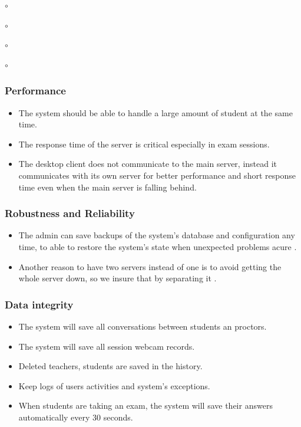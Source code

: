 \documentclass[]{uc2pfecaneva}
\begin{document}
\begin{list}{$\circ$}{}
\begin{list}{$\circ$}{}
\begin{list}{$\circ$}{}
\begin{list}{$\circ$}{}
    \raggedright\subsubsection{Performance}
    \begin{itemize}
        \item The system should be able to handle a large amount of student at the same time.
        \item The response time of the server is critical especially in exam sessions.
        \item The desktop client does not communicate to the main server, instead it communicates with its own server for better performance and short response time even when the main server is falling behind.
    \end{itemize}

    \raggedright\subsubsection{Robustness and Reliability}
    \begin{itemize}
        \item The admin can save backups of the system’s database and configuration any time, to able to restore the system’s state when  unexpected problems acure .
        \item Another reason to have two servers instead of one is to avoid getting the whole server down, so we insure that by separating it .
    \end{itemize}

    \raggedright\subsubsection{Data integrity}
    \begin{itemize}
        \item The system will save all conversations between students an proctors.
        \item The system will save all session webcam records.
        \item Deleted teachers, students are saved in the history.
        \item Keep logs of users activities and system’s exceptions.
        \item When students are taking an exam, the system will save their answers automatically every 30 seconds.
    \end{itemize}


\end{list}
\end{list}
\end{list}
\end{list}
\end{document}
